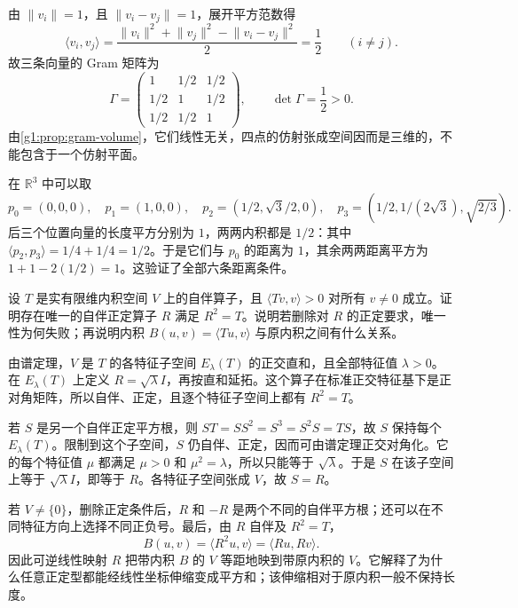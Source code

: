 \begin{solution}
	由 \(\lVert v_i\rVert=1\)，且 \(\lVert v_i-v_j\rVert=1\)，展开平方范数得
	\[
		\langle v_i,v_j\rangle
		=\frac{\lVert v_i\rVert^2+\lVert v_j\rVert^2-\lVert v_i-v_j\rVert^2}{2}
		=\frac12\qquad(i\ne j).
	\]
	故三条向量的 Gram 矩阵为
	\[
		\Gamma=\begin{pmatrix}1&1/2&1/2\\1/2&1&1/2\\1/2&1/2&1\end{pmatrix},
		\qquad \det\Gamma=\frac12>0.
	\]
	由\cref{g1:prop:gram-volume}，它们线性无关，四点的仿射张成空间因而是三维的，不能包含于一个仿射平面。

	在 \(\mathbb R^3\) 中可以取
	\[
		p_0=(0,0,0),\quad p_1=(1,0,0),\quad
		p_2=(1/2,\sqrt3/2,0),\quad
		p_3=(1/2,1/(2\sqrt3),\sqrt{2/3}).
	\]
	后三个位置向量的长度平方分别为 \(1\)，两两内积都是 \(1/2\)：其中 \(\langle p_2,p_3\rangle=1/4+1/4=1/2\)。于是它们与 \(p_0\) 的距离为 \(1\)，其余两两距离平方为 \(1+1-2(1/2)=1\)。这验证了全部六条距离条件。
\end{solution}

\begin{exercise}
	\label{g1:ex:positive-square-root}
	设 \(T\) 是实有限维内积空间 \(V\) 上的自伴算子，且 \(\langle Tv,v\rangle>0\) 对所有 \(v\ne0\) 成立。证明存在唯一的自伴正定算子 \(R\) 满足 \(R^2=T\)。说明若删除对 \(R\) 的正定要求，唯一性为何失败；再说明内积 \(B(u,v)=\langle Tu,v\rangle\) 与原内积之间有什么关系。
\end{exercise}

\begin{solution}
	由谱定理，\(V\) 是 \(T\) 的各特征子空间 \(E_\lambda(T)\) 的正交直和，且全部特征值 \(\lambda>0\)。在 \(E_\lambda(T)\) 上定义 \(R=\sqrt\lambda I\)，再按直和延拓。这个算子在标准正交特征基下是正对角矩阵，所以自伴、正定，且逐个特征子空间上都有 \(R^2=T\)。

	若 \(S\) 是另一个自伴正定平方根，则 \(ST=SS^2=S^3=S^2S=TS\)，故 \(S\) 保持每个 \(E_\lambda(T)\)。限制到这个子空间，\(S\) 仍自伴、正定，因而可由谱定理正交对角化。它的每个特征值 \(\mu\) 都满足 \(\mu>0\) 和 \(\mu^2=\lambda\)，所以只能等于 \(\sqrt\lambda\)。于是 \(S\) 在该子空间上等于 \(\sqrt\lambda I\)，即等于 \(R\)。各特征子空间张成 \(V\)，故 \(S=R\)。

	若 \(V\ne\{0\}\)，删除正定条件后，\(R\) 和 \(-R\) 是两个不同的自伴平方根；还可以在不同特征方向上选择不同正负号。最后，由 \(R\) 自伴及 \(R^2=T\)，
	\[
		B(u,v)=\langle R^2u,v\rangle=\langle Ru,Rv\rangle.
	\]
	因此可逆线性映射 \(R\) 把带内积 \(B\) 的 \(V\) 等距地映到带原内积的 \(V\)。它解释了为什么任意正定型都能经线性坐标伸缩变成平方和；该伸缩相对于原内积一般不保持长度。
\end{solution}


